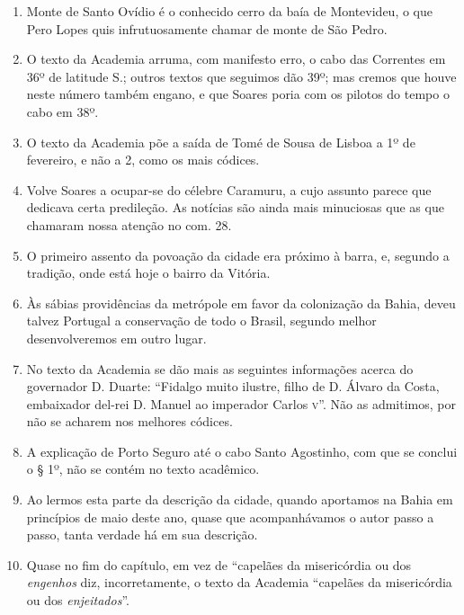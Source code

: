 \begin{enumerate}
\item Monte de Santo Ovídio é o conhecido cerro da baía de Montevideu, o que Pero 
Lopes quis infrutuosamente chamar de monte de São Pedro.

\item O texto da Academia arruma, com manifesto erro, o cabo das Correntes em 36º de 
latitude S.; outros textos que seguimos dão 39º; mas cremos que houve neste número 
também engano, e que Soares poria com os pilotos do tempo o cabo em 38º.

\item O texto da Academia põe a saída de Tomé de Sousa de Lisboa a 1º de fevereiro, e 
não a 2, como os mais códices.

\item  Volve Soares a ocupar-se do célebre Caramuru, a cujo assunto parece
que dedicava certa predileção. As notícias são ainda mais minuciosas que
as que chamaram nossa atenção no com. 28.

\item O primeiro assento da povoação da cidade era próximo à barra, e, segundo a 
tradição, onde está hoje o bairro da Vitória.

\item Às sábias providências da metrópole em favor da colonização da Bahia, deveu 
talvez Portugal a conservação de todo o Brasil, segundo melhor desenvolveremos em 
outro lugar.

\item No texto da Academia se dão mais as seguintes informações acerca do governador 
D. Duarte: ``Fidalgo muito ilustre, filho de D. Álvaro da Costa, embaixador del-rei D. 
Manuel ao imperador Carlos \textsc{v}''.  Não as admitimos, por não se acharem nos melhores 
códices.

\item A explicação de Porto Seguro até o cabo Santo Agostinho, com que se conclui o § 
1º, não se contém no texto acadêmico.

\item Ao lermos esta parte da descrição da cidade, quando aportamos na Bahia em 
princípios de maio deste ano, quase que acompanhávamos o autor passo a passo, tanta 
verdade há em sua descrição.

\item Quase no fim do capítulo, em vez de ``capelães da misericórdia ou dos \textit{engenhos} 
diz, incorretamente, o texto da Academia ``capelães da misericórdia  ou  dos  \textit{enjeitados}''. 


\end{enumerate}
